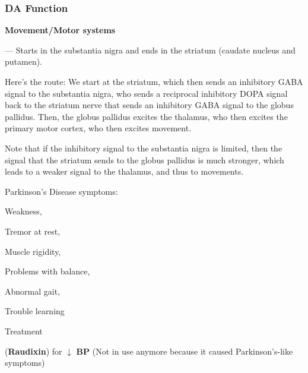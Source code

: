 \subsubsection{DA Function}

\begin{coloredlist}
    \item \textbf{Movement/Motor systems}
    \begin{coloredlist}
        \item {} — Starts in the substantia nigra and ends in the striatum (caudate nucleus and putamen).
        \item Here's the route: We start at the striatum, which then sends an inhibitory GABA signal to the substantia nigra, who sends a reciprocal inhibitory DOPA signal back to the striatum nerve that sends an inhibitory GABA signal to the globus pallidus. Then, the globus pallidus excites the thalamus, who then excites the primary motor cortex, who then excites movement.
        \begin{coloredlist}
            \item Note that if the inhibitory signal to the substantia nigra is limited, then the signal that the striatum sends to the globus pallidus is much stronger, which leads to a weaker signal to the thalamus, and thus to movements.
        \end{coloredlist}
        \item Parkinson's Disease symptoms:
        \begin{coloredlist}
            \item Weakness,
            \item Tremor at rest,
            \item Muscle rigidity,
            \item Problems with balance,
            \item Abnormal gait,
            \item Trouble learning
        \end{coloredlist}
        \item Treatment
        \begin{coloredlist}
            \item {} (\textbf{Raudixin}) for \(\downarrow\) \textbf{BP} (Not in use anymore because it caused Parkinson's-like symptoms)

\end{coloredlist}
\end{coloredlist}
\end{coloredlist}
